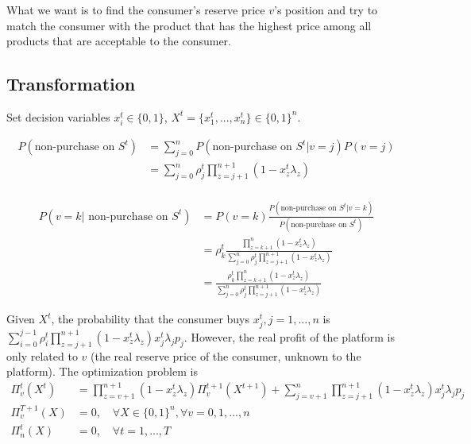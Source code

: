 \documentclass[11pt,a4paper]{article}
\begin{document}
What we want is to find the consumer's reserve price $v$'s position and try to match the consumer with the product that has the highest price among all products that are acceptable to the consumer.

\subsection{Transformation}
Set decision variables  $x^t_i\in\{0,1\}$, $X^t=\{x^t_1,...,x^t_n\}\in\{0,1\}^n$.

\begin{equation}
    \begin{aligned}
        P(\text{non-purchase on }S^t)&=\sum_{j=0}^nP(\text{non-purchase on }S^t\vert v=j)P(v=j)\\
        &=\sum_{j=0}^{n} \rho_j^t\prod_{z=j+1}^{n+1}(1-x^t_z\lambda_{z})\\
    \end{aligned}
    \nonumber
\end{equation}

\begin{equation}
    \begin{aligned}
        P(v=k \vert\text{ non-purchase on }S^t)&=P(v=k)\frac{P(\text{non-purchase on }S^t\vert v=k)}{P(\text{non-purchase on }S^t)}\\
        &=\rho_k^t\frac{\prod_{z=k+1}^{n}(1-x^t_z\lambda_{z})}{\sum_{j=0}^{n} \rho_j^t\prod_{z=j+1}^{n+1}(1-x^t_z\lambda_{z})}\\
        &=\frac{\rho_k^t\prod_{z=k+1}^{n}(1-x^t_z\lambda_{z})}{\sum_{j=0}^{n} \rho_j^t\prod_{z=j+1}^{n+1}(1-x^t_z\lambda_{z})}
    \end{aligned}
    \nonumber
\end{equation}

Given $X^t$, the probability that the consumer buys $x_j^t,j=1,...,n$ is $\sum_{i=0}^{j-1}\rho_i^t\prod_{z=j+1}^{n+1}(1-x_z^t\lambda_{z})x_j^t\lambda_{j}p_j$. However, the real profit of the platform is only related to $v$ (the real reserve price of the consumer, unknown to the platform). The optimization problem is
\begin{equation}
    \begin{aligned}
        \Pi_v^t(X^t)&=\prod_{z=v+1}^{n+1}(1-x^t_z\lambda_{z}) \Pi_v^{t+1}(X^{t+1})+\sum_{j=v+1}^{n}\prod_{z=j+1}^{n+1}(1-x_z^t\lambda_{z})x_j^t\lambda_{j}p_j\\
        \Pi_v^{T+1}(X)&=0,\quad\forall X\in\{0,1\}^n,\forall v=0,1,...,n\\
        \Pi_n^{t}(X)&=0,\quad\forall t=1,...,T
    \end{aligned}
    \nonumber
\end{equation}
\end{document}
